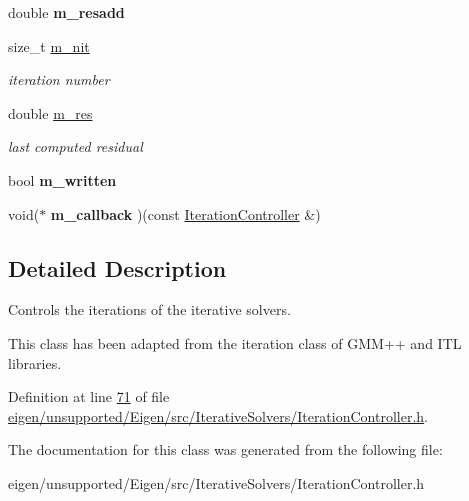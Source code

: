 \begin{DoxyCompactItemize}
\item 
\mbox{\label{class_eigen_1_1_iteration_controller_a6fae2dedef77dda90b893c5fc48d1247}} 
double {\bfseries m\+\_\+resadd}
\item 
\mbox{\label{class_eigen_1_1_iteration_controller_ac9d122615471416cc827a3d8e8ea15f2}} 
size\+\_\+t \hyperlink{class_eigen_1_1_iteration_controller_ac9d122615471416cc827a3d8e8ea15f2}{m\+\_\+nit}
\begin{DoxyCompactList}\small\item\em iteration number \end{DoxyCompactList}\item 
\mbox{\label{class_eigen_1_1_iteration_controller_af60d33d2bdd09f3d00fd73ddc91fc1e6}} 
double \hyperlink{class_eigen_1_1_iteration_controller_af60d33d2bdd09f3d00fd73ddc91fc1e6}{m\+\_\+res}
\begin{DoxyCompactList}\small\item\em last computed residual \end{DoxyCompactList}\item 
\mbox{\label{class_eigen_1_1_iteration_controller_a706c2b8b3dfaadc8625321ce9d7b9b1a}} 
bool {\bfseries m\+\_\+written}
\item 
\mbox{\label{class_eigen_1_1_iteration_controller_abb590e484c904c8aeef1b5c0d9ec5484}} 
void($\ast$ {\bfseries m\+\_\+callback} )(const \hyperlink{class_eigen_1_1_iteration_controller}{Iteration\+Controller} \&)
\end{DoxyCompactItemize}


\subsection{Detailed Description}
Controls the iterations of the iterative solvers. 

This class has been adapted from the iteration class of G\+M\+M++ and I\+TL libraries. 

Definition at line \hyperlink{eigen_2unsupported_2_eigen_2src_2_iterative_solvers_2_iteration_controller_8h_source_l00071}{71} of file \hyperlink{eigen_2unsupported_2_eigen_2src_2_iterative_solvers_2_iteration_controller_8h_source}{eigen/unsupported/\+Eigen/src/\+Iterative\+Solvers/\+Iteration\+Controller.\+h}.



The documentation for this class was generated from the following file\+:\begin{DoxyCompactItemize}
\item 
eigen/unsupported/\+Eigen/src/\+Iterative\+Solvers/\+Iteration\+Controller.\+h\end{DoxyCompactItemize}
